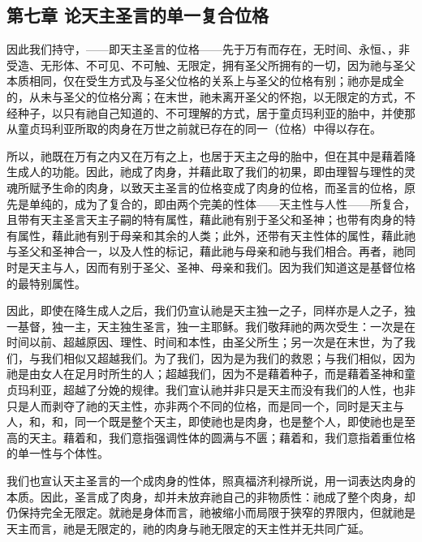 
\subsection{第七章 论天主圣言的单一复合位格}

因此我们持守，——即天主圣言的位格——先于万有而存在，无时间、永恒、，非受造、无形体、不可见、不可触、无限定，拥有圣父所拥有的一切，因为祂与圣父本质相同，仅在受生方式及与圣父位格的关系上与圣父的位格有别；祂亦是成全的，从未与圣父的位格分离；在末世，祂未离开圣父的怀抱，以无限定的方式，不经种子，以只有祂自己知道的、不可理解的方式，居于童贞玛利亚的胎中，并使那从童贞玛利亚所取的肉身在万世之前就已存在的同一（位格）中得以存在。\par

所以，祂既在万有之内又在万有之上，也居于天主之母的胎中，但在其中是藉着降生成人的功能。因此，祂成了肉身，并藉此取了我们的初果，即由理智与理性的灵魂所赋予生命的肉身，以致天主圣言的位格变成了肉身的位格，而圣言的位格，原先是单纯的，成为了复合的，即由两个完美的性体——天主性与人性——所复合，且带有天主圣言天主子嗣的特有属性，藉此祂有别于圣父和圣神；也带有肉身的特有属性，藉此祂有别于母亲和其余的人类；此外，还带有天主性体的属性，藉此祂与圣父和圣神合一，以及人性的标记，藉此祂与母亲和祂与我们相合。再者，祂同时是天主与人，因而有别于圣父、圣神、母亲和我们。因为我们知道这是基督位格的最特别属性。\par

因此，即使在降生成人之后，我们仍宣认祂是天主独一之子，同样亦是人之子，独一基督，独一主，天主独生圣言，独一主耶稣。我们敬拜祂的两次受生：一次是在时间以前、超越原因、理性、时间和本性，由圣父所生；另一次是在末世，为了我们，与我们相似又超越我们。为了我们，因为是为我们的救恩；与我们相似，因为祂是由女人在足月时所生的人；超越我们，因为不是藉着种子，而是藉着圣神和童贞玛利亚，超越了分娩的规律。我们宣认祂并非只是天主而没有我们的人性，也非只是人而剥夺了祂的天主性，亦非两个不同的位格，而是同一个，同时是天主与人，和，和，同一个既是整个天主，即使祂也是肉身，也是整个人，即使祂也是至高的天主。藉着和，我们意指强调性体的圆满与不匮；藉着和，我们意指着重位格的单一性与个体性。\par

我们也宣认天主圣言的一个成肉身的性体，照真福济利禄所说，用一词表达肉身的本质。因此，圣言成了肉身，却并未放弃祂自己的非物质性：祂成了整个肉身，却仍保持完全无限定。就祂是身体而言，祂被缩小而局限于狭窄的界限内，但就祂是天主而言，祂是无限定的，祂的肉身与祂无限定的天主性并无共同广延。\par


